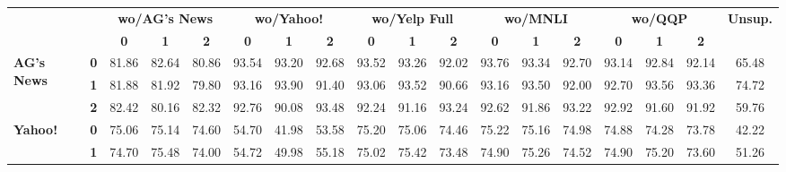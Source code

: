 \clearpage
\thispagestyle{empty}
\begin{sidewaystable*}[h]
	\centering
	\fontsize{8}{20}
	\selectfont
	\setlength\tabcolsep{1pt}
\begin{tabular*}{\columnwidth}{l@{\extracolsep{\fill}}lcccccccccccccccc}
	\toprule
                                    &            & \multicolumn{3}{c}{\textbf{wo/AG's News}}  & \multicolumn{3}{c}{\textbf{wo/Yahoo!}}   & \multicolumn{3}{c}{\textbf{wo/Yelp Full}} & \multicolumn{3}{c}{\textbf{wo/MNLI}}    & \multicolumn{3}{c}{\textbf{wo/QQP}}     & \multirow{2}{*}{\textbf{Unsup.}} \\
                                    &            & \textbf{0} & \textbf{1} & \textbf{2} & \textbf{0} & \textbf{1} & \textbf{2} & \textbf{0}  & \textbf{1}  & \textbf{2} & \textbf{0} & \textbf{1} & \textbf{2} & \textbf{0} & \textbf{1} & \textbf{2} &                                 \\
				    \hline
\multirow{3}{*}{\textbf{AG's News}}    & \textbf{0} & 81.86      & 82.64      & 80.86      & 93.54      & 93.20      & 92.68      & 93.52       & 93.26       & 92.02      & 93.76      & 93.34      & 92.70      & 93.14      & 92.84      & 92.14      & 65.48                           \\
                                    & \textbf{1} & 81.88      & 81.92      & 79.80      & 93.16      & 93.90      & 91.40      & 93.06       & 93.52       & 90.66      & 93.16      & 93.50      & 92.00      & 92.70      & 93.56      & 93.36      & 74.72                           \\
                                    & \textbf{2} & 82.42      & 80.16      & 82.32      & 92.76      & 90.08      & 93.48      & 92.24       & 91.16       & 93.24      & 92.62      & 91.86      & 93.22      & 92.92      & 91.60      & 91.92      & 59.76                           \\
				    \hline
\multirow{3}{*}{\textbf{Yahoo!}}     & \textbf{0} & 75.06      & 75.14      & 74.60      & 54.70      & 41.98      & 53.58      & 75.20       & 75.06       & 74.46      & 75.22      & 75.16      & 74.98      & 74.88      & 74.28      & 73.78      & 42.22                           \\
                                    & \textbf{1} & 74.70      & 75.48      & 74.00      & 54.72      & 49.98      & 55.18      & 75.02       & 75.42       & 73.48      & 74.90      & 75.26      & 74.52      & 74.90      & 75.20      & 73.60      & 51.26                           \\

\end{tabular*}
\end{sidewaystable*}

